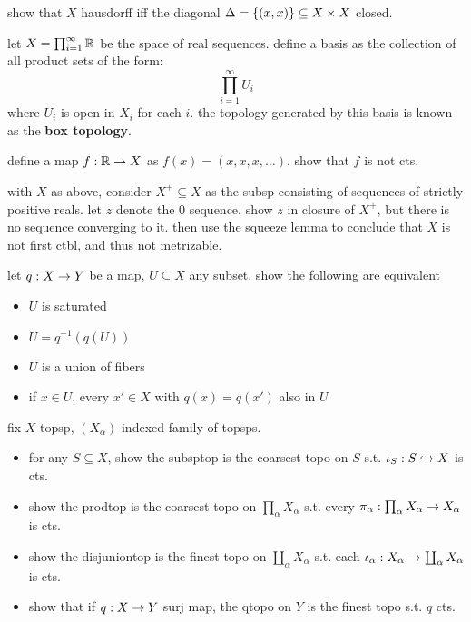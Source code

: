 \begin{exr}[source=Primary Source Material]
    show that $X$ hausdorff iff the diagonal $\Delta=\left\{{(x,x)}\right\}\subseteq
    X\times X$ closed.
\end{exr}

\begin{exr}[source=Primary Source Material]
    let $X = \prod_{i=1}^{\infty}\mathbb{R}$ be the space of real sequences.
    define a basis as the collection of all product sets of the form:
    \begin{equation*}
        \prod_{i=1}^{\infty}U_{i}
    \end{equation*}
    where $U_{i}$ is open in $X_{i}$ for each $i$. the topology generated by this
    basis is known as the \textbf{box topology}.

    define a map $f:\mathbb{R}\rightarrow X$ as $f(x)=(x,x,x,\dots)$. show that $f$ is not
    cts.
\end{exr}

\newpage
\begin{exr}[source=Primary Source Material]
    with $X$ as above, consider $X^{+}\subseteq X$ as the subsp consisting of
    sequences of strictly positive reals. let $z$ denote the 0 sequence. show
    $z$ in closure of $X^{+}$, but there is no sequence converging to it. then
    use the squeeze lemma to conclude that $X$ is not first ctbl, and thus not
    metrizable.
\end{exr}

\begin{exr}[source=Primary Source Material]
    let $q:X\rightarrow Y$ be a map, $U\subseteq X$ any subset. show the following are
    equivalent
    \begin{itemize}
        \item $U$ is saturated
        \item $U = q^{-1}(q(U))$
        \item $U$ is a union of fibers
        \item if $x\in U$, every $x'\in X$ with $q(x)=q(x')$ also in $U$
    \end{itemize}
\end{exr}

\begin{exr}[source=Primary Source Material]
    fix $X$ topsp, $(X_{\alpha})$ indexed family of topsps.
    \begin{itemize}
        \item for any $S \subseteq X$, show the subsptop is the coarsest topo on
            $S$ s.t. $\iota_{S}:S\hookrightarrow X$ is cts.
        \item show the prodtop is the coarsest topo on $\prod_{\alpha}X_{\alpha}$
            s.t. every $\pi_{\alpha}:\prod_{\alpha}X_{\alpha}\rightarrow X_{\alpha}$ is
            cts.
        \item show the disjuniontop is the finest topo on
            $\coprod_{\alpha}X_{\alpha}$ s.t. each $\iota_{\alpha}:X_{\alpha}\rightarrow
            \coprod_{\alpha}X_{\alpha}$ is cts.
        \item show that if $q:X\rightarrow Y$ surj map, the qtopo on $Y$ is the finest
            topo s.t. $q$ cts.
    \end{itemize}
\end{exr}

